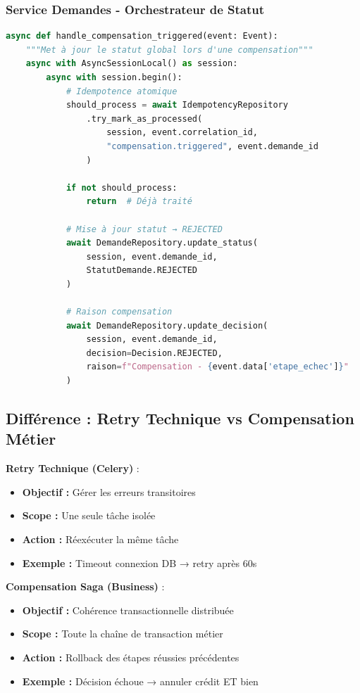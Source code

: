 \documentclass[12pt,a4paper]{article}
\begin{document}
\subsubsection{Service Demandes - Orchestrateur de Statut}

\begin{lstlisting}[language=Python]
async def handle_compensation_triggered(event: Event):
    """Met à jour le statut global lors d'une compensation"""
    async with AsyncSessionLocal() as session:
        async with session.begin():
            # Idempotence atomique
            should_process = await IdempotencyRepository
                .try_mark_as_processed(
                    session, event.correlation_id, 
                    "compensation.triggered", event.demande_id
                )
            
            if not should_process:
                return  # Déjà traité
            
            # Mise à jour statut → REJECTED
            await DemandeRepository.update_status(
                session, event.demande_id, 
                StatutDemande.REJECTED
            )
            
            # Raison compensation
            await DemandeRepository.update_decision(
                session, event.demande_id,
                decision=Decision.REJECTED,
                raison=f"Compensation - {event.data['etape_echec']}"
            )
\end{lstlisting}

\subsection{Différence : Retry Technique vs Compensation Métier}

\textbf{Retry Technique (Celery)} :

\begin{itemize}
    \item \textbf{Objectif :} Gérer les erreurs transitoires
    \item \textbf{Scope :} Une seule tâche isolée
    \item \textbf{Action :} Réexécuter la même tâche
    \item \textbf{Exemple :} Timeout connexion DB → retry après 60s
\end{itemize}

\textbf{Compensation Saga (Business)} :

\begin{itemize}
    \item \textbf{Objectif :} Cohérence transactionnelle distribuée
    \item \textbf{Scope :} Toute la chaîne de transaction métier
    \item \textbf{Action :} Rollback des étapes réussies précédentes
    \item \textbf{Exemple :} Décision échoue → annuler crédit ET bien
\end{itemize}
\end{document}

